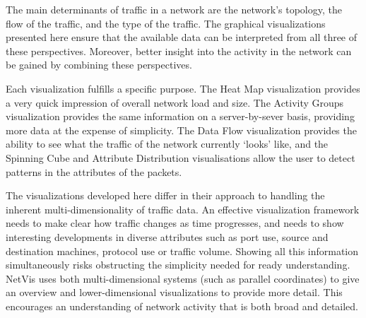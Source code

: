 The main determinants of traffic in a network are the network's topology, the flow of the traffic, and the type of the traffic. The graphical visualizations presented here ensure that the available data can be interpreted from all three of these perspectives. Moreover, better insight into the activity in the network can be gained by combining these perspectives.

Each visualization fulfills a specific purpose.  The Heat Map visualization provides a very quick impression of overall network load and size.  The Activity Groups visualization provides the same information on a server-by-sever basis, providing more data at the expense of simplicity.  The Data Flow visualization provides the ability to see what the traffic of the network currently `looks' like, and the Spinning Cube and Attribute Distribution visualisations allow the user to detect patterns in the attributes of the packets.

The visualizations developed here differ in their approach to handling the inherent multi-dimensionality of traffic data. An effective visualization framework needs to make clear how traffic changes as time progresses, and needs to show interesting developments in diverse attributes such as port use, source and destination machines, protocol use or traffic volume. Showing all this information simultaneously risks obstructing the simplicity needed for ready understanding. NetVis uses both multi-dimensional systems (such as parallel coordinates) to give an overview and lower-dimensional visualizations to provide more detail. This encourages an understanding of network activity that is both broad and detailed.




